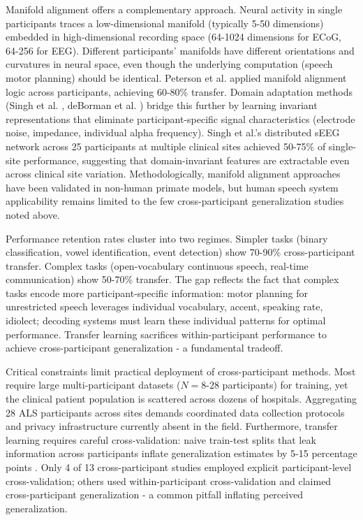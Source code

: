 Manifold alignment offers a complementary approach. Neural activity in single participants traces a low-dimensional manifold (typically 5-50 dimensions) embedded in high-dimensional recording space (64-1024 dimensions for ECoG, 64-256 for EEG). Different participants' manifolds have different orientations and curvatures in neural space, even though the underlying computation (speech motor planning) should be identical. Peterson et al. \cite{Peterson2021} applied manifold alignment logic across participants, achieving 60-80\% transfer. Domain adaptation methods (Singh et al. \cite{Singh2025}, deBorman et al. \cite{deBorman2024}) bridge this further by learning invariant representations that eliminate participant-specific signal characteristics (electrode noise, impedance, individual alpha frequency). Singh et al.'s distributed sEEG network across 25 participants at multiple clinical sites achieved 50-75\% of single-site performance, suggesting that domain-invariant features are extractable even across clinical site variation. Methodologically, manifold alignment approaches have been validated in non-human primate models, but human speech system applicability remains limited to the few cross-participant generalization studies noted above.

Performance retention rates cluster into two regimes. Simpler tasks (binary classification, vowel identification, event detection) show 70-90\% cross-participant transfer. Complex tasks (open-vocabulary continuous speech, real-time communication) show 50-70\% transfer. The gap reflects the fact that complex tasks encode more participant-specific information: motor planning for unrestricted speech leverages individual vocabulary, accent, speaking rate, idiolect; decoding systems must learn these individual patterns for optimal performance. Transfer learning sacrifices within-participant performance to achieve cross-participant generalization - a fundamental tradeoff.

Critical constraints limit practical deployment of cross-participant methods. Most require large multi-participant datasets ($N = 8$-$28$ participants) for training, yet the clinical patient population is scattered across dozens of hospitals. Aggregating 28 ALS participants across sites demands coordinated data collection protocols and privacy infrastructure currently absent in the field. Furthermore, transfer learning requires careful cross-validation: naive train-test splits that leak information across participants inflate generalization estimates by 5-15 percentage points \cite{Peterson2021}. Only 4 of 13 cross-participant studies employed explicit participant-level cross-validation; others used within-participant cross-validation and claimed cross-participant generalization - a common pitfall inflating perceived generalization.

